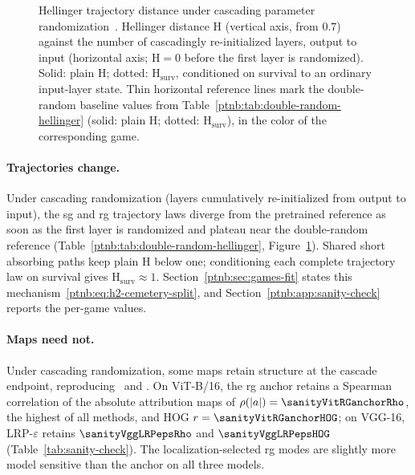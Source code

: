 \begin{figure}[t]
    \centering
    
    \caption[Hellinger trajectory distance under parameter randomization]{Hellinger trajectory distance under cascading parameter
    randomization~\parencite{Adebayo2018sanity}. Hellinger distance $\mathrm{H}$ (vertical axis, from
    $0.7$) against the number of cascadingly re-initialized layers, output to input (horizontal axis;
    $\mathrm{H}=0$ before the first layer is randomized). Solid: plain $\mathrm{H}$; dotted:
    $\mathrm{H}_{\mathrm{surv}}$, conditioned on survival to an ordinary input-layer state. Thin
    horizontal reference lines mark the double-random baseline values from
    Table~\ref{ptnb:tab:double-random-hellinger} (solid: plain $\mathrm{H}$; dotted:
    $\mathrm{H}_{\mathrm{surv}}$), in the color of the corresponding game.}
    \label{ptnb:fig:hellinger-sanity}
\end{figure}

\paragraph{Trajectories change.}\label{ptnb:sec:hellinger-cascading}
Under cascading randomization (layers cumulatively re-initialized from output to input), the \ac{sg} and \ac{rg} trajectory laws diverge from the pretrained reference as soon as the first layer is randomized and plateau near the double-random reference (Table~\ref{ptnb:tab:double-random-hellinger}, Figure~\ref{ptnb:fig:hellinger-sanity}). Shared short absorbing paths keep plain $\mathrm H$ below one; conditioning each complete trajectory law on survival gives $\mathrm H_{\mathrm{surv}}\approx1$. Section~\ref{ptnb:sec:games-fit} states this mechanism~\eqref{ptnb:eq:h2-cemetery-split}, and Section~\ref{ptnb:app:sanity-check} reports the per-game values.

\paragraph{Maps need not.}\label{ptnb:sec:pixel-sanity}
Under cascading randomization, some maps retain structure at the cascade endpoint, reproducing~\textcite{Adebayo2018sanity} and \textcite{sixt2020whenexplanationslie}. On ViT-B/16, the \ac{rg} anchor retains a Spearman correlation of the absolute attribution maps of $\rho(|a|) = \sanityVitRGanchorRho$, the highest of all methods, and HOG $r = \sanityVitRGanchorHOG$; on VGG-16, LRP-$\varepsilon$ retains $\sanityVggLRPepsRho$ and $\sanityVggLRPepsHOG$ (Table~\ref{tab:sanity-check}). The localization-selected \ac{rg} modes are slightly more model sensitive than the anchor on all three models. 

